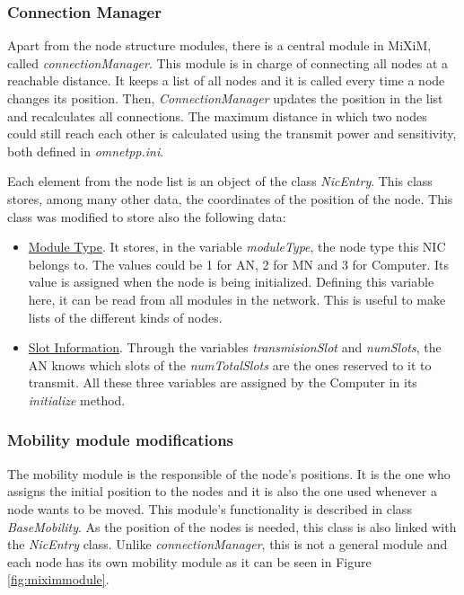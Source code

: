 \subsubsection{Connection Manager}

Apart from the node structure modules, there is a central module in \ac{MiXiM}, called \textit{connectionManager}. This module is in charge of connecting
all nodes at a reachable distance. It keeps a list of all nodes and it is called every time a node changes its position. Then, \textit{ConnectionManager} 
updates the position in the list and recalculates all connections. The maximum distance in which two nodes could still reach each other is 
calculated using the transmit power and sensitivity, both defined in \textit{omnetpp.ini}.

Each element from the node list is an object of the class \textit{NicEntry}. This class stores, among many other data, the coordinates of the
position of the node. This class was modified to store also the following data:

\begin{itemize}
 \item \underline{Module Type}. It stores, in the variable \textit{moduleType}, the node type this \ac{NIC} belongs to. The values could be 1 for \ac{AN}, 
2 for \ac{MN} and 3 for Computer. Its value is assigned when the node is being initialized. Defining this variable here, it can be read from all modules in the 
network. This is useful to make lists of the different kinds of nodes.

 \item \underline{Slot Information}. Through the variables \textit{transmisionSlot} and \textit{numSlots}, the \ac{AN} knows which slots of the 
\textit{numTotalSlots} are the ones reserved to it to transmit. All these three variables are assigned by the Computer in its \textit{initialize} method.
\end{itemize}

\subsubsection{Mobility module modifications}

The mobility module is the responsible of the node's positions. It is the one who assigns the initial position to the nodes and it is also the one
used whenever a node wants to be moved. This module's functionality is described in class \textit{BaseMobility}. As the position of the nodes is needed,
this class is also linked with the \textit{NicEntry} class. Unlike \textit{connectionManager}, this is not a general module and each node has its own
mobility module as it can be seen in Figure \ref{fig:miximmodule}.


